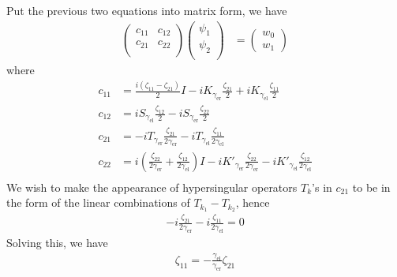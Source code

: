 Put the previous two equations into matrix form, we have
\begin{align*}
  \begin{pmatrix}
    c_{11} & c_{12}\\
    c_{21} & c_{22}\\
  \end{pmatrix} 
  \begin{pmatrix}
    \psi_1 \\ \psi_2 \\ 
  \end{pmatrix} &=
  \begin{pmatrix}
    w_0 \\ w_1 
  \end{pmatrix}
\end{align*}
where
\begin{align*}
  c_{11} &= \frac{i(\zeta_{11}-\zeta_{21})}{2} I-i K_{\gamma_\text{er}} \frac{\zeta_{21}}{2}+i K_{\gamma_\text{el}} \frac{\zeta_{11}}{2} \\
  c_{12} &= i S_{\gamma_\text{el}} \frac{\zeta_{12}}{2}-i S_{\gamma_\text{er}} \frac{\zeta_{22}}{2} \\
  c_{21} &= -i T_{\gamma_\text{er}} \frac{\zeta_{21}}{2 \gamma_\text{er}}-i T_{\gamma_\text{el}} \frac{\zeta_{11}}{2 \gamma_\text{el}} \\
  c_{22} &= i\left(\frac{\zeta_{22}}{2 \gamma_\text{er}}+\frac{\zeta_{12}}{2 \gamma_\text{el}}\right) I-i K'_{\gamma_\text{er}} \frac{\zeta_{22}}{2 \gamma_\text{er}}-i K'_{\gamma_\text{el}} \frac{\zeta_{12}}{2 \gamma_\text{el}} \\
\end{align*}
We wish to make the appearance of hypersingular operators $T_k$'s in $c_{21}$ to be in the form of the linear combinations of $T_{k_1} - T_{k_2}$, hence
\begin{align*}
  -i \frac{\zeta_{21}}{2 \gamma_\text{er}}-i \frac{\zeta_{11}}{2 \gamma_\text{el}} = 0 
\end{align*}
Solving this, we have
\begin{align*}
  \zeta_{11} = -\frac{\gamma_\text{el}}{\gamma_\text{er}}\zeta_{21} 
\end{align*}

